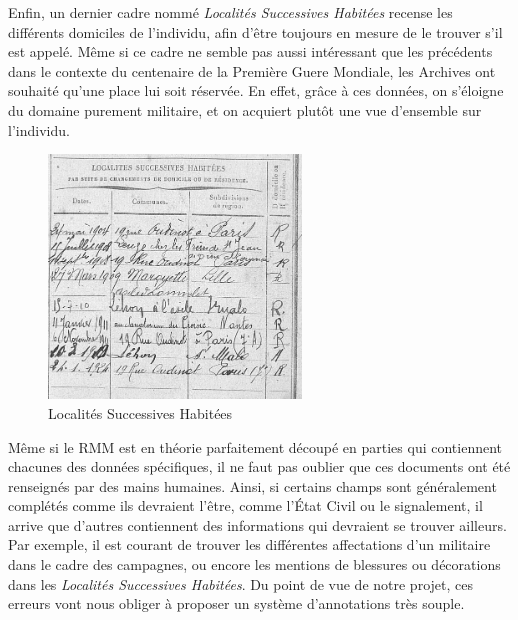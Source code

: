 \documentclass[a4paper]{article}
\begin{document}
    Enfin, un dernier cadre nomm\'e \textit{Localit\'es Successives Habit\'ees} recense les diff\'erents domiciles de l'individu, afin d'\^etre toujours en mesure de le trouver s'il est appel\'e. M\^eme si ce cadre ne semble pas aussi int\'eressant que les pr\'ec\'edents dans le contexte du centenaire de la Premi\`ere Guere Mondiale, les Archives ont souhait\'e qu'une place lui soit r\'eserv\'ee. En effet, gr\^ace \`a ces donn\'ees, on s'\'eloigne du domaine purement militaire, et on acquiert plut\^ot une vue d'ensemble sur l'individu.
\\
    
\begin{figure}[H]
\centering
\includegraphics[width=0.6\textwidth]{Domiciles_2.PNG}
\caption{\label{fig:domiciles}Localit\'es Successives Habit\'ees}
\end{figure}
    
    M\^eme si le RMM est en th\'eorie parfaitement d\'ecoup\'e en parties qui contiennent chacunes des donn\'ees sp\'ecifiques, il ne faut pas oublier que ces documents ont \'et\'e renseign\'es par des mains humaines. Ainsi, si certains champs sont g\'en\'eralement compl\'et\'es comme ils devraient l'\^etre, comme l'\'Etat Civil ou le signalement, il arrive que d'autres contiennent des informations qui devraient se trouver ailleurs. Par exemple, il est courant de trouver les diff\'erentes affectations d'un militaire dans le cadre des campagnes, ou encore les mentions de blessures ou d\'ecorations dans les \textit{Localit\'es Successives Habit\'ees}. Du point de vue de notre projet, ces erreurs vont nous obliger \`a proposer un syst\`eme d'annotations tr\`es souple.
\\
\end{document}
